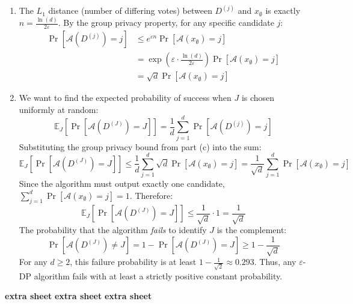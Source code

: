 \documentclass[12pt]{article}
\begin{document}
\begin{enumerate}
\begin{solution}
\begin{enumerate}
    \item[(c)] 
    The $L_1$ distance (number of differing votes) between $D^{(j)}$ and $x_{\emptyset}$ is exactly $n = \frac{\ln(d)}{2\varepsilon}$. By the group privacy property, for any specific candidate $j$:
    \begin{align*}
    \Pr[\mathcal{A}(D^{(j)}) = j] &\le e^{\varepsilon n} \Pr[\mathcal{A}(x_{\emptyset}) = j]\\
    &= \exp\left(\varepsilon \cdot \frac{\ln(d)}{2\varepsilon}\right) \Pr[\mathcal{A}(x_{\emptyset}) = j] \\
    &= \sqrt{d} \Pr[\mathcal{A}(x_{\emptyset}) = j]
    \end{align*}

    \item[(d)] 
    We want to find the expected probability of success when $J$ is chosen uniformly at random:
    \[
    \mathbb{E}_{J} \left[ \Pr[\mathcal{A}(D^{(J)}) = J] \right] = \frac{1}{d} \sum_{j=1}^d \Pr[\mathcal{A}(D^{(j)}) = j]
    \]
    Substituting the group privacy bound from part (c) into the sum:
    \[
    \mathbb{E}_{J} \left[ \Pr[\mathcal{A}(D^{(J)}) = J] \right] \le \frac{1}{d} \sum_{j=1}^d \sqrt{d} \Pr[\mathcal{A}(x_{\emptyset}) = j] = \frac{1}{\sqrt{d}} \sum_{j=1}^d \Pr[\mathcal{A}(x_{\emptyset}) = j]
    \]
    Since the algorithm must output exactly one candidate, $\sum_{j=1}^d \Pr[\mathcal{A}(x_{\emptyset}) = j] = 1$. Therefore:
    \[
    \mathbb{E}_{J} \left[ \Pr[\mathcal{A}(D^{(J)}) = J] \right] \le \frac{1}{\sqrt{d}} \cdot 1 = \frac{1}{\sqrt{d}}
    \]
    The probability that the algorithm \textit{fails} to identify $J$ is the complement:
    \[
    \Pr[\mathcal{A}(D^{(J)}) \neq J] = 1 - \Pr[\mathcal{A}(D^{(J)}) = J] \ge 1 - \frac{1}{\sqrt{d}}
    \]
    For any $d \ge 2$, this failure probability is at least $1 - \frac{1}{\sqrt{2}} \approx 0.293$. Thus, any $\varepsilon$-DP algorithm fails with at least a strictly positive constant probability.
\end{enumerate}
\end{solution}


\begin{problem}
    \newpage
    {\bf extra sheet}
    \newpage
    {\bf extra sheet}
    \newpage
    {\bf extra sheet}
    \newpage
\end{problem}

\end{enumerate}
\end{document}
